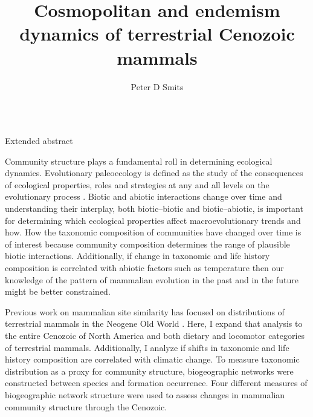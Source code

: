 \documentclass[final]{beamer}\usepackage[]{graphicx}\usepackage[]{color}
\title{Cosmopolitan and endemism dynamics of terrestrial Cenozoic mammals}
\author{Peter D Smits}
\institute{Committee on Evolutionary Biology, University of Chicago}
\newlength{\onecolwid}
\begin{document}
\begin{frame}[t]
  \begin{columns}[t]
    \begin{column}{\onecolwid}
    \begin{block}{Extended abstract}
%

        Community structure plays a fundamental roll in determining ecological dynamics. 
        Evolutionary paleoecology is defined as the study of the consequences of ecological properties, roles and strategies at any and all levels on the evolutionary process \citep{Kitchell1985a}. Biotic and abiotic interactions change over time and understanding their interplay, both biotic--biotic and biotic--abiotic, is important for determining which ecological properties affect macroevolutionary trends and how.
        How the taxonomic composition of communities have changed over time is of interest because community composition determines the range of plausible biotic interactions. Additionally, if change in taxonomic and life history composition is correlated with abiotic factors such as temperature then our knowledge of the pattern of mammalian evolution in the past and in the future might be better constrained.

        Previous work on mammalian site similarity has focused on distributions of terrestrial mammals in the Neogene Old World \citep{Jernvall2002,Jernvall2004}. 
        Here, I expand that analysis to the entire Cenozoic of North America and both dietary and locomotor categories of terrestrial mammals. Additionally, I analyze if shifts in taxonomic and life history composition are correlated with climatic change.
        To measure taxonomic distribution as a proxy for community structure, biogeographic networks were constructed between species and formation occurrence. Four different measures of biogeographic network structure were used to assess changes in mammalian community structure through the Cenozoic.
      \end{block}


\end{column}
\end{columns}
\end{frame}
\end{document}
